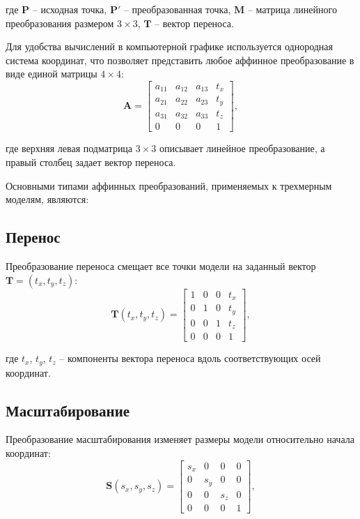 где $\mathbf{P}$ -- исходная точка, $\mathbf{P}'$ -- преобразованная точка, $\mathbf{M}$ -- матрица линейного преобразования размером $3 \times 3$, $\mathbf{T}$ -- вектор переноса.

Для удобства вычислений в компьютерной графике используется однородная система координат, что позволяет представить любое аффинное преобразование в виде единой матрицы $4 \times 4$:
\begin{equation}
	\mathbf{A} = \begin{bmatrix}
		a_{11} & a_{12} & a_{13} & t_x \\
		a_{21} & a_{22} & a_{23} & t_y \\
		a_{31} & a_{32} & a_{33} & t_z \\
		0 & 0 & 0 & 1
	\end{bmatrix},
\end{equation}

где верхняя левая подматрица $3 \times 3$ описывает линейное преобразование, а правый столбец задает вектор переноса.

Основными типами аффинных преобразований, применяемых к трехмерным моделям, являются:

\subsection*{Перенос}
Преобразование переноса смещает все точки модели на заданный вектор $\mathbf{T} = (t_x, t_y, t_z)$:
\begin{equation}
	\mathbf{T}(t_x, t_y, t_z) = \begin{bmatrix}
		1 & 0 & 0 & t_x \\
		0 & 1 & 0 & t_y \\
		0 & 0 & 1 & t_z \\
		0 & 0 & 0 & 1
	\end{bmatrix},
\end{equation}

где $t_x$, $t_y$, $t_z$ -- компоненты вектора переноса вдоль соответствующих осей координат.

\subsection*{Масштабирование}
Преобразование масштабирования изменяет размеры модели относительно начала координат:
\begin{equation}
	\mathbf{S}(s_x, s_y, s_z) = \begin{bmatrix}
		s_x & 0 & 0 & 0 \\
		0 & s_y & 0 & 0 \\
		0 & 0 & s_z & 0 \\
		0 & 0 & 0 & 1
	\end{bmatrix},
\end{equation}


